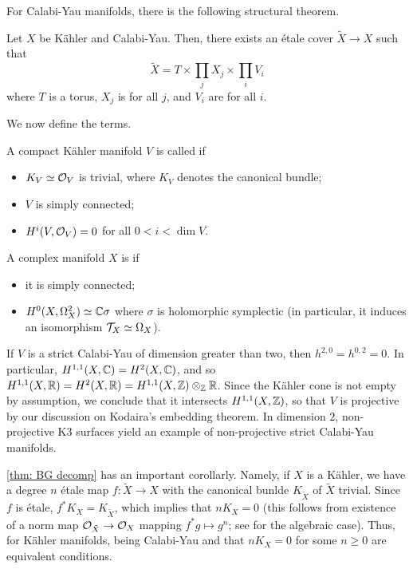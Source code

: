 For Calabi-Yau manifolds, there is the following structural theorem.
\begin{theorem}\label{thm: BG decomp}
	Let $X$ be Kähler and Calabi-Yau. Then, there exists an étale cover $\tilde X\to X$ such that 
	\[
	\tilde X=T\times \prod_jX_j\times \prod_i V_i
	\]
	where $T$ is a torus, $X_j$ is  for all $j$, and $V_i$ are  for all $i$. 
\end{theorem}
We now define the terms.
\begin{definition}
	A compact Kähler manifold $V$ is called  if
	\begin{itemize}
		\item $K_V\simeq \mathcal{O}_V$ is trivial, where $K_V$ denotes the canonical bundle;
		\item $V$ is simply connected;
		\item $H^i(V,\mathcal{O}_V)=0$ for all $0<i<\dim V$.
	\end{itemize}
	A complex manifold $X$ is  if
	\begin{itemize}
		\item it is simply connected;
		\item $H^0(X,\Omega_X^2)\simeq \mathbb C\sigma$ where $\sigma$ is holomorphic symplectic (in particular, it induces an isomorphism $\mathcal{T}_X\simeq \Omega_X$).\qedbarhere
	\end{itemize}
\end{definition}
\begin{remark}
	If $V$ is a strict Calabi-Yau of dimension greater than two, then $h^{2,0}=h^{0,2}=0$. In particular, $H^{1,1}(X,\mathbb C)=H^2(X,\mathbb C)$, and so $H^{1,1}(X,\mathbb R)=H^{2}(X,\mathbb R)=H^{1,1}(X,\mathbb Z)\otimes_\mathbb Z\mathbb R$. Since the Kähler cone is not empty by assumption, we conclude that it intersects $H^{1,1}(X,\mathbb Z)$, so that $V$ is projective by our discussion on Kodaira's embedding theorem. In dimension $2$, non-projective K3 surfaces yield an example of non-projective strict Calabi-Yau manifolds.
\end{remark}
\begin{remark}
\autoref{thm: BG decomp} has an important corollarly. Namely, if $X$ is a Kähler, we have a degree $n$ étale map $f:\tilde X\to X$ with the canonical bunlde $K_{\tilde X}$ of $\tilde X$ trivial. Since $f$ is étale, $f^*K_X=K_{\tilde X}$, which implies that $nK_X=0$ (this follows from existence of a norm map $\mathcal{O}_{\tilde X}\to \mathcal{O}_X$ mapping $f^*g\mapsto g^n$; see \cite[\href{https://stacks.math.columbia.edu/tag/0BD3}{Tag 0BD3} and \href{https://stacks.math.columbia.edu/tag/0BCY}{Tag 0BCY}]{stacks-project} for the algebraic case). Thus, for Kähler manifolds, being Calabi-Yau and that $nK_X=0$ for some $n\geq 0$ are equivalent conditions.
\end{remark}














